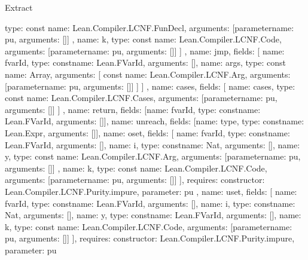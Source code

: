 \begin{lexlean}{Extract}
\begin{toolingmodule}
{{{{              type: const{
                name: Lean.Compiler.LCNF.FunDecl,
                arguments: [parameter{name: pu, arguments: []}]
              }
            },
            {
              name: k,
              type: const{
                name: Lean.Compiler.LCNF.Code,
                arguments: [parameter{name: pu, arguments: []}]
              }
            }
          ]
        },
        {
          name: jmp,
          fields: [
            {name: fvarId, type: const{name: Lean.FVarId, arguments: []}},
            {
              name: args,
              type: const{
                name: Array,
                arguments: [
                  const{
                    name: Lean.Compiler.LCNF.Arg,
                    arguments: [parameter{name: pu, arguments: []}]
                  }
                ]
              }
            }
          ]
        },
        {
          name: cases,
          fields: [
            {
              name: cases,
              type: const{
                name: Lean.Compiler.LCNF.Cases,
                arguments: [parameter{name: pu, arguments: []}]
              }
            }
          ]
        },
        {name: return, fields: [{name: fvarId, type: const{name: Lean.FVarId, arguments: []}}]},
        {name: unreach, fields: [{name: type, type: const{name: Lean.Expr, arguments: []}}]},
        {
          name: oset,
          fields: [
            {name: fvarId, type: const{name: Lean.FVarId, arguments: []}},
            {name: i, type: const{name: Nat, arguments: []}},
            {
              name: y,
              type: const{
                name: Lean.Compiler.LCNF.Arg,
                arguments: [parameter{name: pu, arguments: []}]
              }
            },
            {
              name: k,
              type: const{
                name: Lean.Compiler.LCNF.Code,
                arguments: [parameter{name: pu, arguments: []}]
              }
            }
          ],
          requires: {constructor: Lean.Compiler.LCNF.Purity.impure, parameter: pu}
        },
        {
          name: uset,
          fields: [
            {name: fvarId, type: const{name: Lean.FVarId, arguments: []}},
            {name: i, type: const{name: Nat, arguments: []}},
            {name: y, type: const{name: Lean.FVarId, arguments: []}},
            {
              name: k,
              type: const{
                name: Lean.Compiler.LCNF.Code,
                arguments: [parameter{name: pu, arguments: []}]
              }
            }
          ],
          requires: {constructor: Lean.Compiler.LCNF.Purity.impure, parameter: pu}
}}}
\end{toolingmodule}
\end{lexlean}
